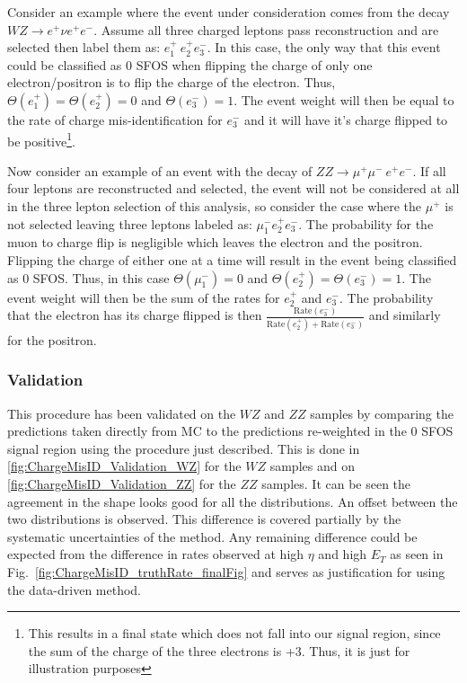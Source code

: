 Consider an example where the event under consideration comes from the 
decay $WZ\rightarrow e^{+}\nu e^{+}e^{-}$. Assume all three charged leptons 
pass reconstruction and are selected then label 
them as: $e^{+}_1~e^{+}_2e^{-}_3$. In this case,
the only way that this event could be classified as 0 SFOS when 
flipping the charge of only one electron/positron is to flip the 
charge of the electron.
Thus, $\Theta(e^{+}_1)=\Theta(e^{+}_2)=0$ and $\Theta(e^{-}_3)=1$.  The event 
weight will then be equal to the rate of charge mis-identification 
for  $e^{-}_3$ and it will have it's charge flipped 
to be positive\footnote{This results in a final state
which does not fall into our signal region, since the sum of the
charge of the three electrons is +3. Thus, it is just for illustration purposes}.

Now consider an example of an event with 
the decay of $ZZ\rightarrow \mu^{+}\mu^{-}~ e^{+}e^{-}$.
If all four leptons are reconstructed and selected, the event will not 
be considered at all in the three lepton selection of this analysis, so 
consider the case where the $\mu^{+}$ is not selected leaving three leptons 
labeled as: $\mu^{-}_1 e^{+}_2 e^{-}_3$.  The probability for the muon to 
charge flip is negligible which leaves the electron and the positron. Flipping 
the charge of either one at a time will result in the event being 
classified as 0 SFOS.  Thus, in
this case $\Theta(\mu^{-}_1)=0$ and $\Theta(e^{+}_2)=\Theta(e^{-}_3)=1$. The 
event weight will then be the sum of the rates for $e^{+}_2$ and $e^{-}_3$.
The probability that the electron has its charge flipped is then 
$\frac{\textrm{Rate}(e^{-}_3) }{ \textrm{Rate}(e^{+}_2)+ \textrm{Rate}(e^{-}_3)}$ 
and similarly for the positron.

\subsubsection{Validation}
This procedure has been validated on the $WZ$ and $ZZ$ samples by comparing 
the predictions taken directly from MC to the predictions re-weighted in the 
0 SFOS signal region using the procedure just described. This is done in 
\fig\ref{fig:ChargeMisID_Validation_WZ} for the $WZ$ samples and on 
\fig\ref{fig:ChargeMisID_Validation_ZZ} for the $ZZ$ samples. It can be seen 
the agreement in the shape looks good for all the distributions. An offset 
between the two distributions is observed. This difference is covered partially by 
the systematic uncertainties of the method.  Any remaining difference could 
be expected from the difference in rates observed at high $\eta$ and 
high $E_{T}$ as seen in Fig.~\ref{fig:ChargeMisID_truthRate_finalFig} and 
serves as justification for using the data-driven method.

